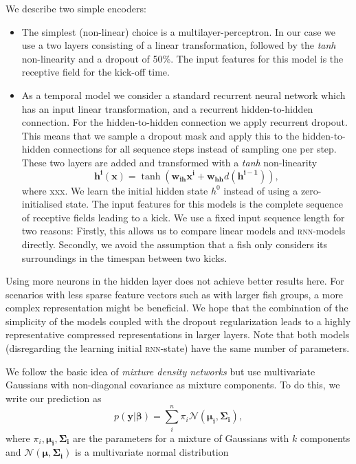 \documentclass[nobib]{tufte-handout}
\begin{document}
We describe two simple encoders:
\begin{itemize}
\item The simplest (non-linear) choice is a multilayer-perceptron.
  In our case we use a two layers consisting of a linear transformation, followed by the \textit{tanh} non-linearity and a dropout\autocite{dropout} of 50\%.
  The input features for this model is the receptive field for the kick-off time.
\item
  As a temporal model we consider a standard recurrent neural network which has an input linear transformation, and a recurrent hidden-to-hidden connection.
  For the hidden-to-hidden connection we apply recurrent dropout.
  This means that we sample a dropout mask and apply this to the hidden-to-hidden connections for all sequence steps instead of sampling one per step.
  These two layers are added and transformed with a \textit{tanh} non-linearity
  \begin{equation*}
    \bm{h^i} (\bm{x}) = \operatorname{tanh} \left( \bm{w_{ih}} \bm{x^i} + \bm{w_{hh}} d (\bm{h^{i-1}}) \right),
  \end{equation*}
  where xxx.
  We learn the initial hidden state \(h^0\) instead of using a zero-initialised state.
  The input features for this models is the complete sequence of receptive fields leading to a kick.
  We use a fixed input sequence length for two reasons:
  Firstly, this allows us to compare linear models and \textsc{rnn}-models directly.
  Secondly, we avoid the assumption that a fish only considers its surroundings in the timespan between two kicks.
\end{itemize}
Using more neurons in the hidden layer does not achieve better results here.
For scenarios with less sparse feature vectors such as with larger fish groups, a more complex representation might be beneficial.
We hope that the combination of the simplicity of the models coupled with the dropout regularization leads to a highly representative compressed representations in larger layers.
Note that both models (disregarding the learning initial \textsc{rnn}-state) have the same number of parameters.

We follow the basic idea of \textit{mixture density networks}\autocite{mdn} but use multivariate Gaussians with non-diagonal covariance as mixture components.
To do this, we write our prediction as
\begin{equation*}
p \left( \bm{y} | \bm{\beta} \right) = \sum_{i}^n \pi_i \mathcal{N} \left( \bm{\mu_i}, \bm{\Sigma_i} \right),
\end{equation*}
where \(\pi_i, \bm{\mu_i}, \bm{\Sigma_i}\) are the parameters for a mixture of Gaussians with \(k\) components and \(\mathcal{N}(\bm{\mu}, \bm{\Sigma_i})\) is a multivariate normal distribution 
\end{document}
